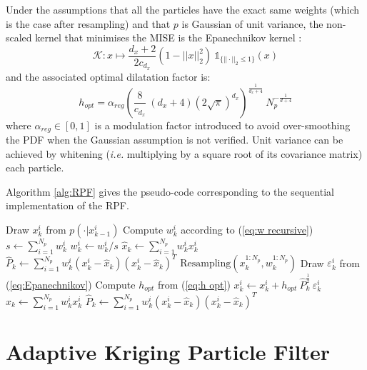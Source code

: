 \documentclass[conference]{IEEEtran}
\begin{document}
Under the assumptions that all the particles have the exact same weights (which is the case after resampling) and that $p$ is Gaussian of unit variance, the non-scaled kernel that minimises the MISE is the Epanechnikov kernel \cite{bib:Epanechnikov}:
\begin{equation}
\mathcal{K} : x \mapsto \frac{d_x+2}{2c_{d_x}}\left(1-||x||_2^2\right) \: \mathbb{1}_{\{||\cdot||_2\leq1\}}(x) \label{eq:Epanechnikov}
\end{equation}
and the associated optimal dilatation factor is:
\begin{equation}
h_{opt} = \alpha_{reg}\left(\frac{8}{c_{d_x}} \: (d_x+4) \left(2\sqrt{\pi}\right)^{d_x}\right)^{\frac{1}{d_x+4}} \: N_p^{-\frac{1}{d+4}} \label{eq:h opt}
\end{equation}
where $\alpha_{reg} \in [0,1]$ is a modulation factor introduced to avoid over-smoothing the PDF when the Gaussian assumption is not verified. Unit variance can be achieved by whitening (\textit{i.e.} multiplying by a square root of its covariance matrix) each particle.

Algorithm \ref{alg:RPF} gives the pseudo-code corresponding to the sequential implementation of the RPF.

\begin{algorithm}[ht]
\begin{algorithmic}
\State Draw $x_k^i$ from $p(\cdot|x_{k-1}^i)$ 
\State Compute $w_k^i$ according to (\ref{eq:w recursive}) 
\EndFor
\State $s \gets \sum_{i=1}^{N_p} w_k^i$
\State $w_k^i \gets w_k^i / s$ 
\EndFor
\State $\hat x_k \gets \sum_{i=1}^{N_p} w_k^i x_k^i$ 
\State $\hat P_k \gets \sum_{i=1}^{N_p} w_k^i (x_k^i - \hat x_k) (x_k^i - \hat x_k)^T$
\If{(\ref{eq:resampling})}
\State $\text{Resampling}\left(x_k^{1:N_p},w_k^{1:N_p}\right)$ 
\State Draw $\varepsilon_k^i$ from (\ref{eq:Epanechnikov}) 
\State Compute $h_{opt}$ from (\ref{eq:h opt})
\State $x_k^i \gets x_k^i + h_{opt}\:\hat P_k^{\frac{1}{2}}\:\varepsilon_k^i$
\EndFor
\State $\hat x_k \gets \sum_{i=1}^{N_p} w_k^i x_k^i$ 
\State $\hat P_k \gets \sum_{i=1}^{N_p} w_k^i (x_k^i - \hat x_k) (x_k^i - \hat x_k)^T$
\EndIf
\end{algorithmic} \caption{RPF} \label{alg:RPF}
\end{algorithm}

\section{Adaptive Kriging Particle Filter}
\end{document}

